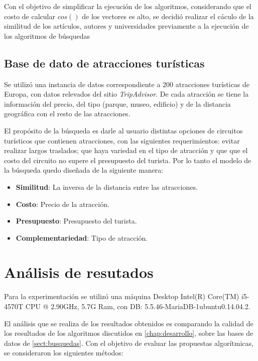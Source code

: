 Con el objetivo de simplificar la ejecución de los algoritmos, considerando que el costo de calcular $cos()$ de los vectores es alto, se decidió realizar el cáculo de la similitud de los artículos, autores y universidades previamente a la ejecución de los algoritmos de búsquedas

\subsection{Base de dato de atracciones turísticas}
Se utilizó una instancia de datos correspondiente a 200 atracciones turísticas de Europa, con datos relevados del sitio \textit{TripAdvisor}. De cada atracción se tiene la información del precio, del tipo (parque, museo, edificio) y de la distancia geográfica con el resto de las atracciones.

El propósito de la búsqueda es darle al usuario distintas opciones de circuitos turísticos que contienen atracciones, con las siguientes requerimientos: evitar realizar largos traslados; que haya variedad en el tipo de atracción y que que el costo del circuito no supere el presupuesto del turista. Por lo tanto el modelo de la búsqueda quedo diseñada de la siguiente manera:

\begin{itemize}
	\item \textbf{Similitud}: La inversa de la distancia entre las atracciones. 
	\item \textbf{Costo}: Precio de la atracción. 
	\item \textbf{Presupuesto}: Presupuesto del turista. 
	\item \textbf{Complementariedad}: Tipo de atracción.
\end{itemize}

\section{Análisis de resutados}\label{sect:resultados}

Para la experimentación se utilizó una máquina Desktop Intel(R) Core(TM) i5-4570T CPU @ 2.90GHz, 5.7G Ram, con DB: 5.5.46-MariaDB-1ubuntu0.14.04.2.

El análisis que se realiza de los resultados obtenidos es comparando la calidad de los resultados de los algoritmos discutidos en \autoref{chap:desarrollo}, sobre las bases de datos de \autoref{sect:busquedas}. Con el objetivo de evaluar las propuestas algorítmicas, se consideraron los siguientes métodos:

